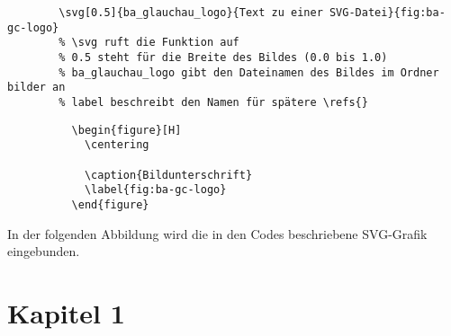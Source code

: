     \begin{code}[H]
      \begin{verbatim}
        \svg[0.5]{ba_glauchau_logo}{Text zu einer SVG-Datei}{fig:ba-gc-logo}
        % \svg ruft die Funktion auf
        % 0.5 steht für die Breite des Bildes (0.0 bis 1.0)
        % ba_glauchau_logo gibt den Dateinamen des Bildes im Ordner bilder an
        % label beschreibt den Namen für spätere \refs{}
      \end{verbatim}
      \caption{SVG-Grafiken mittels Bild-Funktion einbinden}
      \label{code:svg-einfuegen1}
      \end{code}

      \begin{code}[H]
        \begin{verbatim}
          \begin{figure}[H]
            \centering
            
            \caption{Bildunterschrift}
            \label{fig:ba-gc-logo}
          \end{figure}
        \end{verbatim}
        \caption{SVG-Grafiken mittels Environments einfügen}
        \label{code:bildsvg-einfuegen2}
      \end{code}

      In der folgenden Abbildung wird die in den Codes beschriebene SVG-Grafik eingebunden.

\section{Kapitel 1}
  \blindtext
